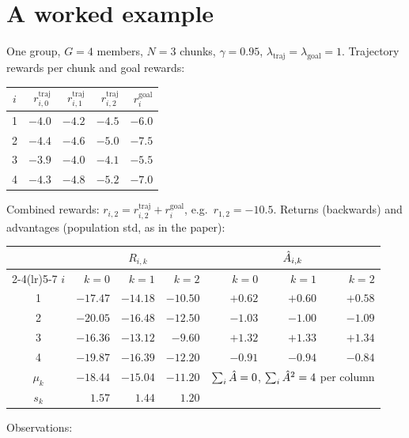 \section{A worked example}
\label{loop:app:toy}
One group, $G=4$ members, $N=3$ chunks, $\gamma=0.95$, $\lambda_{\mathrm{traj}}=\lambda_{\mathrm{goal}}=1$. Trajectory rewards per chunk and goal rewards:
\begin{center}
\small
\begin{tabular}{@{}c rrr r@{}}
\toprule
$i$ & $r^{\mathrm{traj}}_{i,0}$ & $r^{\mathrm{traj}}_{i,1}$ & $r^{\mathrm{traj}}_{i,2}$ & $r^{\mathrm{goal}}_i$\\
\midrule
1 & $-4.0$ & $-4.2$ & $-4.5$ & $-6.0$\\
2 & $-4.4$ & $-4.6$ & $-5.0$ & $-7.5$\\
3 & $-3.9$ & $-4.0$ & $-4.1$ & $-5.5$\\
4 & $-4.3$ & $-4.8$ & $-5.2$ & $-7.0$\\
\bottomrule
\end{tabular}
\end{center}
Combined rewards: $r_{i,2}=r^{\mathrm{traj}}_{i,2}+r^{\mathrm{goal}}_i$, e.g.\ $r_{1,2}=-10.5$. Returns (backwards) and advantages (population std, as in the paper):
\begin{center}
\small
\begin{tabular}{@{}c rrr rrr@{}}
\toprule
& \multicolumn{3}{c}{$R_{i,k}$} & \multicolumn{3}{c}{$\hat A_{i,k}$}\\
\cmidrule(lr){2-4}\cmidrule(lr){5-7}
$i$ & $k=0$ & $k=1$ & $k=2$ & $k=0$ & $k=1$ & $k=2$\\
\midrule
1 & $-17.47$ & $-14.18$ & $-10.50$ & $+0.62$ & $+0.60$ & $+0.58$\\
2 & $-20.05$ & $-16.48$ & $-12.50$ & $-1.03$ & $-1.00$ & $-1.09$\\
3 & $-16.36$ & $-13.12$ & $-9.60$ & $+1.32$ & $+1.33$ & $+1.34$\\
4 & $-19.87$ & $-16.39$ & $-12.20$ & $-0.91$ & $-0.94$ & $-0.84$\\
\midrule
$\mu_k$ & $-18.44$ & $-15.04$ & $-11.20$ & \multicolumn{3}{c}{$\sum_i\hat A=0$, $\sum_i\hat A^2=4$ per column}\\
$s_k$ & $1.57$ & $1.44$ & $1.20$ & & &\\
\bottomrule
\end{tabular}
\end{center}
Observations:
